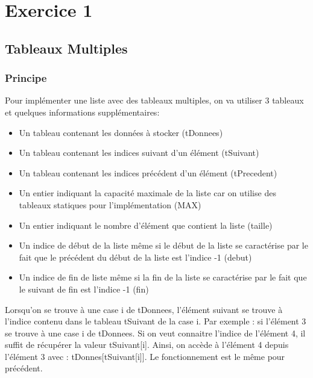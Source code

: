 \documentclass{report}
\title{}
\author{}
\date{}
\begin{document}
  \maketitle
  \tableofcontents
  
  \chapter{Exercice 1}
    \section{Tableaux Multiples}
      \subsection{Principe}
        Pour implémenter une liste avec des tableaux multiples, on va utiliser 3 tableaux et quelques informations supplémentaires: 
        \begin{itemize}
          \item Un tableau contenant les données à stocker (tDonnees)
          \item Un tableau contenant les indices suivant d'un élément (tSuivant)
          \item Un tableau contenant les indices précédent d'un élément (tPrecedent)
          \item Un entier indiquant la capacité maximale de la liste car on utilise des tableaux statiques pour l'implémentation (MAX)
          \item Un entier indiquant le nombre d'élément que contient la liste (taille)
          \item Un indice de début de la liste même si le début de la liste se caractérise par le fait que le précédent du début de la liste est l'indice -1 (debut)
          \item Un indice de fin de liste même si la fin de la liste se caractérise par le fait que le suivant de fin est l'indice -1 (fin)
        \end{itemize}
        Lorsqu'on se trouve à une case i de tDonnees, l'élément suivant se trouve à l'indice contenu dans le tableau tSuivant de la case i.
        Par exemple : si l'élément 3 se trouve à une case i de tDonnees. Si on veut connaitre l'indice de l'élément 4, il suffit de récupérer la valeur tSuivant[i]. Ainsi, on accède à l'élément 4 depuis l'élément 3 avec : tDonnes[tSuivant[i]].
        Le fonctionnement est le même pour précédent.
        
\end{document}

